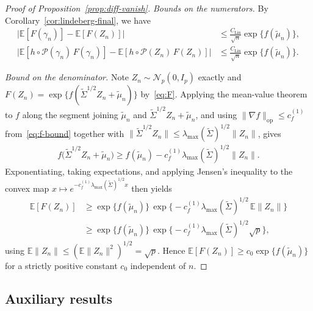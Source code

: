 \documentclass[12pt]{article}
\newcommand{\op}{\mathrm{op}}
\newcommand{\Ee}{{\mathbb{E}}}
\newcommand{\cP}{{\mathcal{P}}}
\begin{document}
\begin{appendices}
\begin{proof}[Proof of Proposition~\ref{prop:diff-vanish}]
\noindent\emph{Bounds on the numerators.} By Corollary~\ref{cor:lindeberg-final}, we have 
\begin{equation}
\begin{aligned}
  \big|\Ee[F(\gamma_n)]-\Ee[F(Z_n)]\big|
  &\le\frac{C_{\mathrm{Lin}}}{\sqrt n}\exp\{f(\widetilde\mu_n)\},\\
  \big|\Ee[h\circ\cP(\gamma_n)\,F(\gamma_n)]
       -\Ee[h\circ\cP(Z_n)\,F(Z_n)]\big|
  &\le\frac{C_{\mathrm{Lin}}}{\sqrt n}\exp\{f(\widetilde\mu_n)\}.
\end{aligned}
\label{bounds:num}
\end{equation}

\medskip\noindent\emph{Bound on the denominator.} 
Note $Z_n\sim\mathcal N_p(0,I_p)$ exactly and 
$F(Z_n)=\exp\{f(\widetilde\Sigma^{1/2}Z_n+\widetilde\mu_n)\}$ by~\eqref{eq:F}. Applying the mean-value theorem to $f$ along the segment joining
$\widetilde\mu_n$ and $\widetilde\Sigma^{1/2}Z_n+\widetilde\mu_n$, and using
$\|\nabla f\|_{\op}\le c_f^{(1)}$ from~\eqref{eq:f-bound} together with
$\|\widetilde\Sigma^{1/2}Z_n\|\le\lambda_{\max}(\widetilde\Sigma)^{1/2}\|Z_n\|$,
gives
\begin{align*}
  f\big(\widetilde\Sigma^{1/2}Z_n+\widetilde\mu_n\big)
  \ge f(\widetilde\mu_n)
     -c_f^{(1)}\lambda_{\max}(\widetilde\Sigma)^{1/2}\|Z_n\|.
\end{align*}
Exponentiating, taking expectations, and applying Jensen's inequality to the
convex map $x\mapsto e^{-c_f^{(1)}\lambda_{\max}(\widetilde\Sigma)^{1/2}x}$
then yields
\begin{equation}
\begin{aligned}
  \Ee[F(Z_n)]
  &\ge\exp\{f(\widetilde\mu_n)\}\,
       \exp\!\big\{-c_f^{(1)}\lambda_{\max}(\widetilde\Sigma)^{1/2}\,
       \Ee\|Z_n\|\big\}\\
   &\ge\exp\{f(\widetilde\mu_n)\}\,
       \exp\!\big\{-c_f^{(1)}\lambda_{\max}(\widetilde\Sigma)^{1/2}\sqrt p\big\},
\end{aligned}
\label{bound:den}
\end{equation}
using $\Ee\|Z_n\|\le(\Ee\|Z_n\|^2)^{1/2}=\sqrt p$. 
Hence
$\Ee[F(Z_n)]\ge c_0\exp\{f(\widetilde\mu_n)\}$ for a strictly positive
constant $c_0$ independent of $n$. 
\end{proof}

\subsection{Auxiliary results}
\label{app:aux-results}



\end{appendices}
\end{document}
